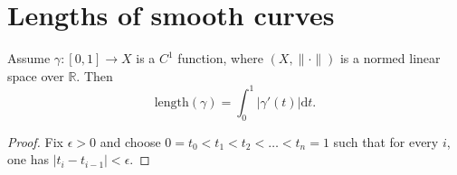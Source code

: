 \section{Lengths of smooth curves}
\begin{ExpLnSmCrv}
Assume $\gamma: \left[ 0,1 \right] \to X$ is a $C^1$ function, where $(X,\|\cdot\|)$ is a normed linear space over $\mathbb{R}$. Then
\begin{equation*}
\text{length}(\gamma)= \int_{0}^{1} \left|\gamma'(t)\right| \mathrm{d}t.
\end{equation*}
\end{ExpLnSmCrv}
\begin{proof}
Fix $\epsilon > 0$ and choose $0 = t_0 < t_1 < t_2 < \ldots < t_n = 1$ such that for every $i$, one has $\left|t_i-t_{i-1}\right| < \epsilon$.
\end{proof}